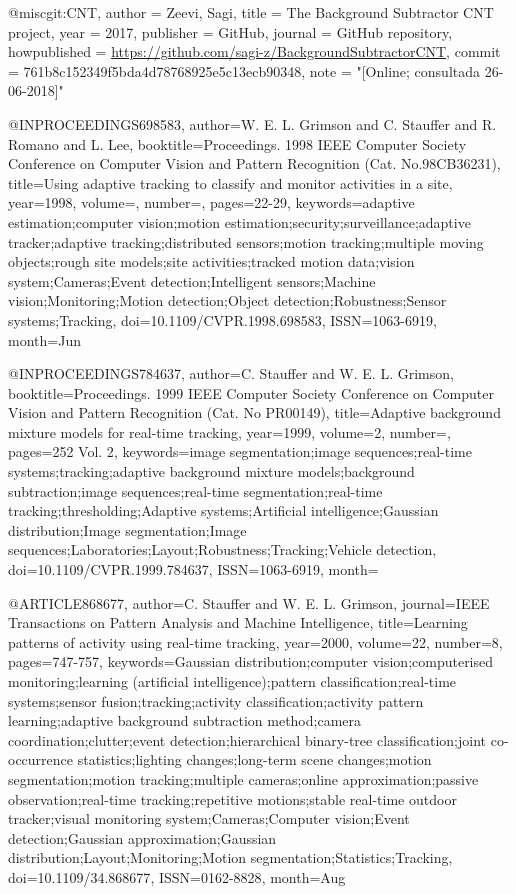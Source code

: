 @misc{git:CNT,
  author = {Zeevi, Sagi},
  title = {The Background Subtractor CNT project},
  year = {2017},
  publisher = {GitHub},
  journal = {GitHub repository},
  howpublished = {\url{https://github.com/sagi-z/BackgroundSubtractorCNT}},
  commit = {761b8c152349f5bda4d78768925e5c13ecb90348},
  note = "[Online; consultada 26-06-2018]"
}

@INPROCEEDINGS{698583,
    author={W. E. L. Grimson and C. Stauffer and R. Romano and L. Lee},
    booktitle={Proceedings. 1998 IEEE Computer Society Conference on Computer Vision and Pattern Recognition (Cat. No.98CB36231)},
    title={Using adaptive tracking to classify and monitor activities in a site},
    year={1998},
    volume={},
    number={},
    pages={22-29},
    keywords={adaptive estimation;computer vision;motion estimation;security;surveillance;adaptive tracker;adaptive tracking;distributed sensors;motion tracking;multiple moving objects;rough site models;site activities;tracked motion data;vision system;Cameras;Event detection;Intelligent sensors;Machine vision;Monitoring;Motion detection;Object detection;Robustness;Sensor systems;Tracking},
    doi={10.1109/CVPR.1998.698583},
    ISSN={1063-6919},
    month={Jun}
}

@INPROCEEDINGS{784637,
    author={C. Stauffer and W. E. L. Grimson},
    booktitle={Proceedings. 1999 IEEE Computer Society Conference on Computer Vision and Pattern Recognition (Cat. No PR00149)},
    title={Adaptive background mixture models for real-time tracking},
    year={1999},
    volume={2},
    number={},
    pages={252 Vol. 2},
    keywords={image segmentation;image sequences;real-time systems;tracking;adaptive background mixture models;background subtraction;image sequences;real-time segmentation;real-time tracking;thresholding;Adaptive systems;Artificial intelligence;Gaussian distribution;Image segmentation;Image sequences;Laboratories;Layout;Robustness;Tracking;Vehicle detection},
    doi={10.1109/CVPR.1999.784637},
    ISSN={1063-6919},
    month={}
}

@ARTICLE{868677,
    author={C. Stauffer and W. E. L. Grimson},
    journal={IEEE Transactions on Pattern Analysis and Machine Intelligence},
    title={Learning patterns of activity using real-time tracking},
    year={2000},
    volume={22},
    number={8},
    pages={747-757},
    keywords={Gaussian distribution;computer vision;computerised monitoring;learning (artificial intelligence);pattern classification;real-time systems;sensor fusion;tracking;activity classification;activity pattern learning;adaptive background subtraction method;camera coordination;clutter;event detection;hierarchical binary-tree classification;joint co-occurrence statistics;lighting changes;long-term scene changes;motion segmentation;motion tracking;multiple cameras;online approximation;passive observation;real-time tracking;repetitive motions;stable real-time outdoor tracker;visual monitoring system;Cameras;Computer vision;Event detection;Gaussian approximation;Gaussian distribution;Layout;Monitoring;Motion segmentation;Statistics;Tracking},
    doi={10.1109/34.868677},
    ISSN={0162-8828},
    month={Aug}
}

